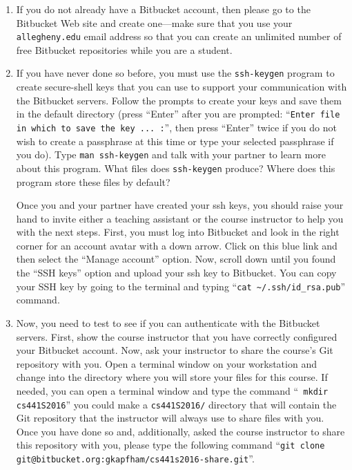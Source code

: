 \begin{enumerate}

  \item If you do not already have a Bitbucket account, then please go to the Bitbucket Web site and create one---make sure
    that you use your {\tt allegheny.edu} email address so that you can create an unlimited number of free Bitbucket
    repositories while you are a student.

  \item If you have never done so before, you must use the {\tt ssh-keygen} program to create secure-shell keys that you
    can use to support your communication with the Bitbucket servers. Follow the prompts to create your keys and save
    them in the default directory (press ``Enter'' after you are prompted: ``{\tt Enter file in which to save the key ...
    :}'', then press ``Enter'' twice if you do not wish to create a passphrase at this time or type your selected
    passphrase if you do).   Type {\tt man ssh-keygen} and talk with your partner to learn more about this program.
    What files does {\tt ssh-keygen} produce?  Where does this program store these files by default?

    Once you and your partner have created your ssh keys, you should raise your hand to invite either a teaching
    assistant or the course instructor to help you with the next steps. First, you must log into Bitbucket and look in the
    right corner for an account avatar with a down arrow.  Click on this blue link and then select the ``Manage
    account'' option. Now, scroll down until you found the ``SSH keys'' option and upload your ssh key to Bitbucket. You
    can copy your SSH key by going to the terminal and typing ``{\tt cat \textasciitilde{}/.ssh/id\_rsa.pub}'' command.

  \item Now, you need to test to see if you can authenticate with the Bitbucket servers.  First, show the course
    instructor that you have correctly configured your Bitbucket account.  Now, ask your instructor to share the
    course's Git repository with you.  Open a terminal window on your workstation and change into the directory where
    you will store your files for this course.  If needed, you can open a terminal window and type the command ``{\tt
      mkdir cs441S2016}'' you could make a {\tt cs441S2016/} directory that will contain the Git repository that the
      instructor will always use to share files with you.  Once you have done so and, additionally, asked the course
      instructor to share this repository with you, please type the following command ``{\tt git clone
      git@bitbucket.org:gkapfham/cs441s2016-share.git}''.


\end{enumerate}
